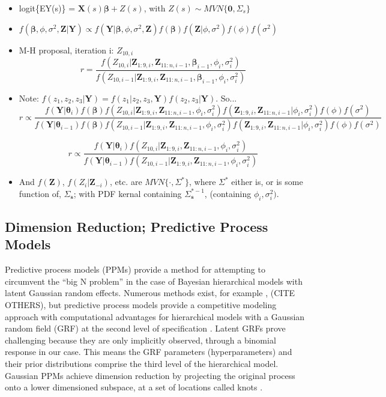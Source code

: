 \begin{itemize}
\item logit\{EY(s)\} = $\pmb{X}(s)\pmb{\beta} + Z(s)$, with $Z(s) \sim MVN\{\pmb{0}, \Sigma_{s}\}$
\item $f(\pmb{\beta}, \phi, \sigma^{2}, \pmb{Z}|\pmb{Y}) \propto f(\pmb{Y}|\pmb{\beta}, \phi, \sigma^{2}, \pmb{Z})f(\pmb{\beta})f(\pmb{Z}|\phi, \sigma^{2})f(\phi)f(\sigma^{2})$
\item M-H proposal, iteration i: $Z_{10,i}$
$$ r = \frac{ f(Z_{10,i}|\pmb{Z}_{1:9,i},\pmb{Z}_{11:n,i-1}, \pmb{\beta}_{i-1}, \phi_{i}, \sigma^{2}_{i})}{f(Z_{10,i-1}|\pmb{Z}_{1:9,i},\pmb{Z}_{11:n,i-1}, \pmb{\beta}_{i-1}, \phi_{i}, \sigma^{2}_{i})} $$
 
\item Note: $f(z_{1}, z_{2}, z_{3}|\pmb{Y}) = f(z_{1}|z_{2},z_{3},\pmb{Y})f(z_{2},z_{3}|\pmb{Y})$. So... $$r \propto \frac{f(\pmb{Y}|\pmb{\theta}_{i})f(\pmb{\beta})f(Z_{10,i}|\pmb{Z}_{1:9,i},\pmb{Z}_{11:n,i-1}, \phi_{i}, \sigma^{2}_{i})f(\pmb{Z}_{1:9,i},\pmb{Z}_{11:n,i-1}|\phi_{i}, \sigma^{2}_{i})f(\phi)f(\sigma^{2})} {f(\pmb{Y}|\pmb{\theta}_{i-1})f(\pmb{\beta})f(Z_{10,i-1}|\pmb{Z}_{1:9,i},\pmb{Z}_{11:n,i-1}, \phi_{i}, \sigma^{2}_{i})f(\pmb{Z}_{1:9,i},\pmb{Z}_{11:n,i-1}|\phi_{i}, \sigma^{2}_{i})f(\phi)f(\sigma^{2})}$$

$$ r \propto \frac{f(\pmb{Y}|\pmb{\theta}_{i})f(Z_{10,i}|\pmb{Z}_{1:9,i},\pmb{Z}_{11:n,i-1}, \phi_{i}, \sigma^{2}_{i})}
{f(\pmb{Y}|\pmb{\theta}_{i-1})f(Z_{10,i-1}|\pmb{Z}_{1:9,i},\pmb{Z}_{11:n,i-1}, \phi_{i}, \sigma^{2}_{i})} $$

\item And $f(\pmb{Z})$, $f(Z_{i}|\pmb{Z}_{-i})$, etc. are $MVN\{\cdot,\Sigma^{*}\}$, where $\Sigma^{*}$ either is, or is some function of, $\Sigma_{\pmb{s}}$; with PDF kernal containing $\Sigma_{\pmb{s}}^{*-1}$, (containing $\phi_{i}, \sigma^{2}_{i})$.

\end{itemize}

\subsection{Dimension Reduction; Predictive Process Models} %

Predictive process models (PPMs) provide a method for attempting to circumvent the ``big N problem'' in the case of Bayesian hierarchical models with latent Gaussian random effects. Numerous methods exist, for example \citep{Cressie2008}, (CITE OTHERS), but predictive process models provide a competitive modeling approach with computational advantages for hierarchical models with a Gaussian random field (GRF) at the second level of specification \citep{Banerjee2008}. Latent GRFs prove challenging because they are only implicitly observed, through a binomial response in our case. This means the GRF parameters (hyperparameters) and their prior distributions comprise the third level of the hierarchical model. Gaussian PPMs achieve dimension reduction by projecting the original process onto a lower dimensioned subspace, at a set of locations called knots \citep{Banerjee2008}. 

